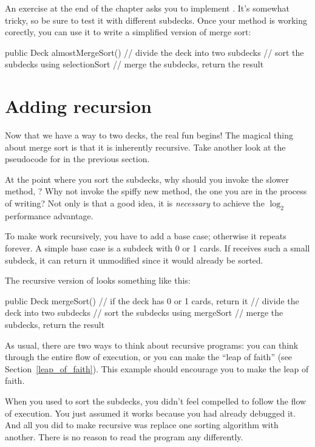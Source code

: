 An exercise at the end of the chapter asks you to implement .
It's somewhat tricky, so be sure to test it with different subdecks.
Once your  method is working corectly, you can use it to write a simplified version of merge sort:

\begin{code}
public Deck almostMergeSort() {
    // divide the deck into two subdecks
    // sort the subdecks using selectionSort
    // merge the subdecks, return the result
}
\end{code}


\section{Adding recursion}

Now that we have a way to  two decks, the real fun begins!
The magical thing about merge sort is that it is inherently recursive.
Take another look at the pseudocode for  in the previous section.

At the point where you sort the subdecks, why should you invoke the slower method, ?
Why not invoke the spiffy new  method, the one you are in the process of writing?
Not only is that a good idea, it is {\em necessary} to achieve the $\log_2$ performance advantage.

To make  work recursively, you have to add a base case; otherwise it repeats forever.
A simple base case is a subdeck with 0 or 1 cards.
If  receives such a small subdeck, it can return it unmodified since it would already be sorted.

The recursive version of  looks something like this:

\begin{code}
public Deck mergeSort() {
    // if the deck has 0 or 1 cards, return it
    // divide the deck into two subdecks
    // sort the subdecks using mergeSort
    // merge the subdecks, return the result
}
\end{code}


As usual, there are two ways to think about recursive programs: you can think through the entire flow of execution, or you can make the ``leap of faith'' (see Section~\ref{leap_of_faith}).
This example should encourage you to make the leap of faith.

When you used  to sort the subdecks, you didn't feel compelled to follow the flow of execution.
You just assumed it works because you had already debugged it.
And all you did to make  recursive was replace one sorting algorithm with another.
There is no reason to read the program any differently.

